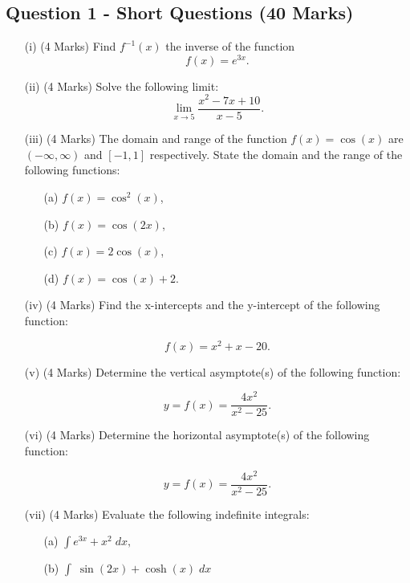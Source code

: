 \documentclass[a4paper,12pt]{article}
\begin{document}
\subsection*{Question 1 - Short Questions (40 Marks)}

\begin{itemize}
	
	\item[(i)](4 Marks) Find $f^{-1}(x)$ the inverse of the function
	\[f(x) = e^{3x}. \]
		\smallskip
	\item[(ii)](4 Marks)	Solve the following limit:
	\[\lim_{x \to 5 } \frac{x^2- 7x +10}{x-5}.\]
	\smallskip
	\item[(iii)] (4 Marks) The domain and range of the function $f(x) = \cos(x)$ are $(-\infty, \infty)$ and $[-1,1]$ respectively. State the domain and the range of the following functions:
	\begin{multicols}{2}
		\begin{itemize}
		
		
	\item[(a)] $f(x) = \cos^2(x)  $,
		\item[(b)] $f(x) = \cos(2x)  $,
	\item[(c)] $f(x) = 2\cos(x)  $,
		\item[(d)] $f(x) = \cos(x) +2$.
	\end{itemize}
	\end{multicols}
	\smallskip

	
	\item[(iv)] (4 Marks) Find the x-intercepts and the y-intercept of the following function:
	
	\[ f(x) = x^2 + x - 20 . \]
	
	\smallskip
	\item[(v)] (4 Marks) Determine the vertical asymptote(s) of the following function:
	
	
	\[ y = f(x) = \frac{4x^2}{x^2-25}. \]	
	\smallskip
	\item[(vi)] (4 Marks) Determine the horizontal asymptote(s) of the following function:
	
	\[ y = f(x) = \frac{4x^2}{x^2-25}.\]
		
	\smallskip
	\newpage
	\item[(vii)] (4 Marks) Evaluate the following indefinite integrals:
	\begin{multicols}{2}
	\begin{itemize}
		\item[(a)] $\displaystyle{ \int  e^{3x} + x^2\; dx, }  $
		\item[(b)] $\displaystyle{ \int \;\sin(2x)+ \cosh(x)\; dx}$
		

\end{itemize}
\end{multicols}
\end{itemize}
\end{document}
